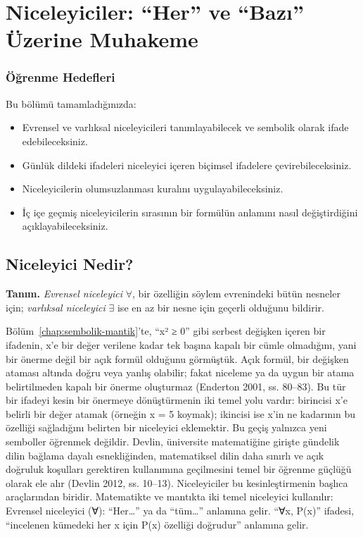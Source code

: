 \chapter{Niceleyiciler: “Her” ve “Bazı” Üzerine Muhakeme}
\label{chap:niceleyiciler}

\subsection*{Öğrenme Hedefleri}

Bu bölümü tamamladığınızda:

\begin{itemize}\setlength{\itemsep}{2pt}\setlength{\parskip}{0pt}
\item Evrensel ve varlıksal niceleyicileri tanımlayabilecek ve sembolik olarak ifade edebileceksiniz.
\item Günlük dildeki ifadeleri niceleyici içeren biçimsel ifadelere çevirebileceksiniz.
\item Niceleyicilerin olumsuzlanması kuralını uygulayabileceksiniz.
\item İç içe geçmiş niceleyicilerin sırasının bir formülün anlamını nasıl değiştirdiğini açıklayabileceksiniz.
\end{itemize}

\section{Niceleyici Nedir?}

\begin{tcolorbox}[bookbox,colback=cDef]
\textbf{\textsf{\textcolor{cAcc}{Tanım.}}}\quad
\emph{Evrensel niceleyici} $\forall$, bir özelliğin söylem evrenindeki bütün nesneler için; \emph{varlıksal niceleyici} $\exists$ ise en az bir nesne için geçerli olduğunu bildirir.
\end{tcolorbox}

Bölüm~\ref{chap:sembolik-mantik}’te, “x² ≥ 0” gibi serbest değişken içeren bir ifadenin, x’e bir değer verilene kadar tek başına kapalı bir cümle olmadığını, yani bir önerme değil bir açık formül olduğunu görmüştük. Açık formül, bir değişken ataması altında doğru veya yanlış olabilir; fakat niceleme ya da uygun bir atama belirtilmeden kapalı bir önerme oluşturmaz (Enderton 2001, ss. 80–83). Bu tür bir ifadeyi kesin bir önermeye dönüştürmenin iki temel yolu vardır: birincisi x’e belirli bir değer atamak (örneğin x = 5 koymak); ikincisi ise x’in ne kadarının bu özelliği sağladığını belirten bir niceleyici eklemektir. Bu geçiş yalnızca yeni semboller öğrenmek değildir. Devlin, üniversite matematiğine girişte gündelik dilin bağlama dayalı esnekliğinden, matematiksel dilin daha sınırlı ve açık doğruluk koşulları gerektiren kullanımına geçilmesini temel bir öğrenme güçlüğü olarak ele alır (Devlin 2012, ss. 10–13). Niceleyiciler bu kesinleştirmenin başlıca araçlarından biridir. Matematikte ve mantıkta iki temel niceleyici kullanılır: Evrensel niceleyici (∀): “Her…” ya da “tüm…” anlamına gelir. “∀x, P(x)” ifadesi, “incelenen kümedeki her x için P(x) özelliği doğrudur” anlamına gelir.

